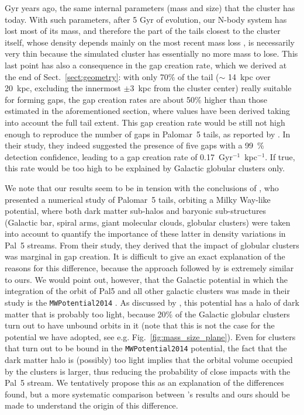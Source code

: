 \documentclass[draft]{aa}
\begin{document}
Gyr years ago, the same internal parameters (mass and size) that the cluster has today. With such parameters, after 5 Gyr of evolution, our N-body system has lost most of its mass, and therefore the part of the tails closest to the cluster itself, whose density depends mainly on the most recent mass loss \citep[see, for example, Fig.~A.3 in][]{2012A&A...546L...7M}, is necessarily very thin because the simulated cluster has essentially no more mass to lose. This last point has also a consequence in the gap creation rate, which we derived at the end of Sect.~\ref{sect:geometry}: with only 70\% of the tail  ($\sim$ 14~kpc over 20~kpc, excluding the innermost $\pm 3$~kpc from the cluster center) really suitable for forming gaps, the gap creation rates are about 50$\%$ higher than those estimated in the aforementioned section, where values have been derived taking into account the full tail extent.  This gap creation rate would be still not high enough to reproduce the  number of gaps in Palomar~5 tails, as reported by \citet{2012ApJ...760...75C}. In their study, they indeed suggested the presence of  five gaps with a 99~\% detection confidence, leading to a gap creation rate of 0.17~Gyr$^{-1}$~kpc$^{-1}$. If true, this rate would be too high to be explained by Galactic globular clusters only. 
  
  We note that our results seem to be in tension with the conclusions of \citet{2019MNRAS.484.2009B}, who presented a numerical study of Palomar~5 tails, orbiting a Milky Way-like potential, where both dark matter sub-halos and baryonic sub-structures (Galactic bar, spiral arms, giant molecular clouds, globular clusters) were taken into account to quantify the importance of these latter in density variations in Pal~5 streams. From their study, they derived that the impact of globular clusters was marginal in gap creation. It is difficult to give an exact explanation of the reasons for this difference, because the approach followed by  \citet{2019MNRAS.484.2009B} is extremely similar to ours. We would point out, however, that the Galactic potential in which the integration of the orbit of Pal5 and all other galactic clusters was made in their study is the \texttt{MWPotential2014} \citep{2015ApJS..216...29B}. As discussed by \citet{2022ApJ...926..107M}, this potential has a halo of dark matter that is probably too light, because 20\% of the Galactic globular clusters turn out to have unbound orbits in it (note that this is not the case for the potential we have adopted, see e.g. Fig.~\ref{fig:mass_size_plane}). Even for clusters that turn out to be bound in the  \texttt{MWPotential2014} potential, the fact that the dark matter halo is (possibly) too light implies that the orbital volume occupied by the clusters is larger, thus reducing the probability of close impacts with the Pal~5 stream. We tentatively propose this as an explanation of the differences found, but a more systematic comparison between \citet{2019MNRAS.484.2009B}'s results and ours should be made to understand the origin of this difference. \\
  
\end{document}
